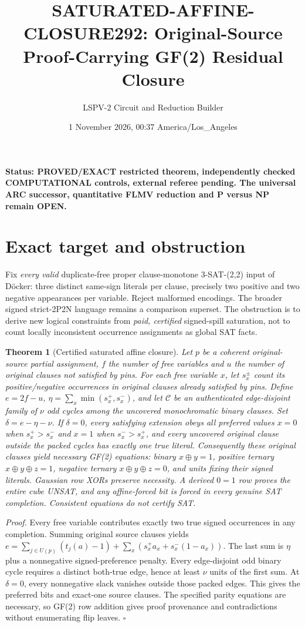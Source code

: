 \documentclass[11pt]{article}
\title{SATURATED-AFFINE-CLOSURE292: Original-Source Proof-Carrying GF(2) Residual Closure}
\author{LSPV-2 Circuit and Reduction Builder}
\date{1 November 2026, 00:37 America/Los\_Angeles}
\newtheorem{theorem}{Theorem}
\begin{document}
\maketitle
\noindent\textbf{Status: PROVED/EXACT restricted theorem, independently checked COMPUTATIONAL controls, external referee pending. The universal ARC successor, quantitative FLMV reduction and P versus NP remain OPEN.}
\section*{Exact target and obstruction}
Fix \emph{every valid} duplicate-free proper clause-monotone 3-SAT-(2,2) input of D\"ocker: three distinct same-sign literals per clause, precisely two positive and two negative appearances per variable. Reject malformed encodings. The broader signed strict-2P2N language remains a comparison superset. The obstruction is to derive new logical constraints from \emph{paid, certified} signed-spill saturation, not to count locally inconsistent occurrence assignments as global SAT facts.
\begin{theorem}[Certified saturated affine closure]
Let $p$ be a coherent original-source partial assignment, $f$ the number of free variables and $u$ the number of original clauses not satisfied by pins. For each free variable $x$, let $s_x^\pm$ count its positive/negative occurrences in original clauses already satisfied by pins. Define $e=2f-u$, $\eta=\sum_x\min(s_x^+,s_x^-)$, and let $\mathcal C$ be an authenticated \emph{edge-disjoint} family of $\nu$ odd cycles among the uncovered monochromatic binary clauses. Set $\delta=e-\eta-\nu$. If $\delta=0$, every satisfying extension obeys all preferred values $x=0$ when $s_x^+>s_x^-$ and $x=1$ when $s_x^->s_x^+$, and every uncovered original clause outside the packed cycles has \emph{exactly one} true literal. Consequently these original clauses yield necessary GF(2) equations: binary $x\oplus y=1$, positive ternary $x\oplus y\oplus z=1$, negative ternary $x\oplus y\oplus z=0$, and units fixing their signed literals. Gaussian row XORs preserve necessity. A derived $0=1$ row proves the entire cube UNSAT, and any affine-forced bit is forced in every genuine SAT completion. Consistent equations do not certify SAT.
\end{theorem}
\noindent\textit{Proof.} Every free variable contributes exactly two true signed occurrences in any completion. Summing original source clauses yields $e=\sum_{j\in U(p)}(t_j(a)-1)+\sum_x(s_x^+a_x+s_x^-(1-a_x))$. The last sum is $\eta$ plus a nonnegative signed-preference penalty. Every edge-disjoint odd binary cycle requires a distinct both-true edge, hence at least $\nu$ units of the first sum. At $\delta=0$, every nonnegative slack vanishes outside those packed edges. This gives the preferred bits and exact-one source clauses. The specified parity equations are necessary, so GF(2) row addition gives proof provenance and contradictions without enumerating flip leaves. $\square$
\end{document}
